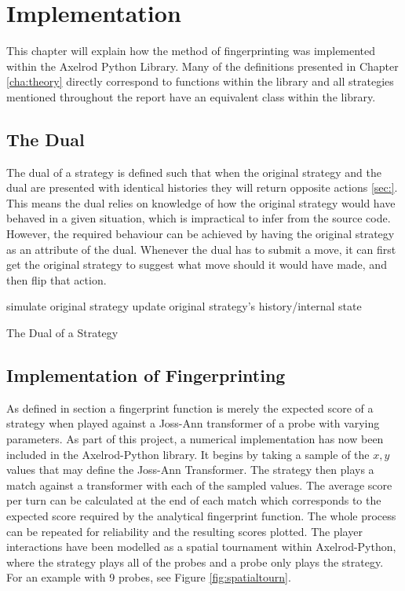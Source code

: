 
\chapter{Implementation}\label{cha:implementation}

This chapter will explain how the method of fingerprinting was implemented within the Axelrod Python Library.
Many of the definitions presented in Chapter \ref{cha:theory} directly correspond to functions within the library and all strategies mentioned throughout the report have an equivalent class within the library.

\section{The Dual}
The dual of a strategy is defined such that when the original strategy and the dual are presented with identical histories they will return opposite actions \ref{sec:}. %
This means the dual relies on knowledge of how the original strategy would have behaved in a given situation, which is impractical to infer from the source code.
However, the required behaviour can be achieved by having the original strategy as an attribute of the dual.
Whenever the dual has to submit a move, it can first get the original strategy to suggest what move should it would have made, and then flip that action.

\IncMargin{1.2em}
\begin{algorithm}[H]
  simulate original strategy\;
  update original strategy's history/internal state\;
 \caption{The Dual of a Strategy}
\end{algorithm}\DecMargin{1.5em}

\section{Implementation of Fingerprinting}\label{sec:fingerprint-implementation}

As defined in section a fingerprint function is merely the expected score of a strategy when played against a Joss-Ann transformer of a probe with varying parameters. %
As part of this project, a numerical implementation has now been included in the Axelrod-Python library.
It begins by taking a sample of the $x,y$ values that may define the Joss-Ann Transformer.
The strategy then plays a match against a transformer with each of the sampled values.
The average score per turn can be calculated at the end of each match which corresponds to the expected score required by the analytical fingerprint function.
The whole process can be repeated for reliability and the resulting scores plotted.
The player interactions have been modelled as a spatial tournament within Axelrod-Python, where the strategy plays all of the probes and a probe only plays the strategy.
For an example with 9 probes, see Figure \ref{fig:spatialtourn}.

